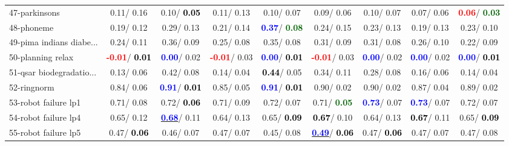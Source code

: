 \begin{table}[h]
\begin{center}
\begin{tabular}{lc|c|c|c|c|c|c|c}
47-parkinsons &   0.11/  0.16 &   0.10/\textcolor{black}{\textbf{  0.05}} &   0.11/  0.13 &   0.10/  0.07 &   0.09/  0.06 &   0.10/  0.07 &   0.07/  0.06 & \textcolor{red}{\textbf{  0.06}}/\textcolor{darkgreen}{\textbf{  0.03}} \\
48-phoneme &   0.19/  0.12 &   0.29/  0.13 &   0.21/  0.14 & \textcolor{blue}{\textbf{  0.37}}/\textcolor{darkgreen}{\textbf{  0.08}} &   0.24/  0.15 &   0.23/  0.13 &   0.19/  0.13 &   0.23/  0.10 \\
49-pima indians diabe... &   0.24/  0.11 &   0.36/  0.09 &   0.25/  0.08 &   0.35/  0.08 &   0.31/  0.09 &   0.31/  0.08 &   0.26/  0.10 &   0.22/  0.09 \\
50-planning relax & \textcolor{red}{\textbf{ -0.01}}/\textcolor{black}{\textbf{  0.01}} & \textcolor{blue}{\textbf{  0.00}}/  0.02 & \textcolor{red}{\textbf{ -0.01}}/  0.03 & \textcolor{blue}{\textbf{  0.00}}/\textcolor{black}{\textbf{  0.01}} & \textcolor{red}{\textbf{ -0.01}}/  0.03 & \textcolor{blue}{\textbf{  0.00}}/  0.02 & \textcolor{blue}{\textbf{  0.00}}/  0.02 & \textcolor{blue}{\textbf{  0.00}}/\textcolor{black}{\textbf{  0.01}} \\
51-qsar biodegradatio... &   0.13/  0.06 &   0.42/  0.08 &   0.14/  0.04 & \textcolor{black}{\textbf{  0.44}}/  0.05 &   0.34/  0.11 &   0.28/  0.08 &   0.16/  0.06 &   0.14/  0.04 \\
52-ringnorm &   0.84/  0.06 & \textcolor{blue}{\textbf{  0.91}}/\textcolor{black}{\textbf{  0.01}} &   0.85/  0.05 & \textcolor{blue}{\textbf{  0.91}}/\textcolor{black}{\textbf{  0.01}} &   0.90/  0.02 &   0.90/  0.02 &   0.87/  0.04 &   0.89/  0.02 \\
53-robot failure lp1 &   0.71/  0.08 &   0.72/\textcolor{black}{\textbf{  0.06}} &   0.71/  0.09 &   0.72/  0.07 &   0.71/\textcolor{darkgreen}{\textbf{  0.05}} & \textcolor{blue}{\textbf{  0.73}}/  0.07 & \textcolor{blue}{\textbf{  0.73}}/  0.07 &   0.72/  0.07 \\ \hline
54-robot failure lp4 &   0.65/  0.12 & \underline{\textcolor{blue}{\textbf{  0.68}}}/  0.11 &   0.64/  0.13 &   0.65/\textcolor{black}{\textbf{  0.09}} & \textcolor{black}{\textbf{  0.67}}/  0.10 &   0.64/  0.13 & \textcolor{black}{\textbf{  0.67}}/  0.11 &   0.65/\textcolor{black}{\textbf{  0.09}} \\
55-robot failure lp5 &   0.47/\textcolor{black}{\textbf{  0.06}} &   0.46/  0.07 &   0.47/  0.07 &   0.45/  0.08 & \underline{\textcolor{blue}{\textbf{  0.49}}}/\textcolor{black}{\textbf{  0.06}} &   0.47/\textcolor{black}{\textbf{  0.06}} &   0.47/  0.07 &   0.47/  0.08 \\

\end{tabular}
\end{center}
\end{table}
